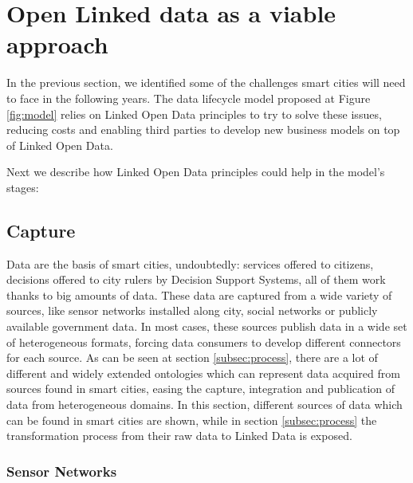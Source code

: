 \section{Open Linked data as a viable approach}

In the previous section, we identified some of the challenges smart cities will need to face in the following years. The data lifecycle model proposed at Figure \ref{fig:model} relies on Linked Open Data principles to try to solve these issues, reducing costs and enabling third parties to develop new business models on top of Linked Open Data.

Next we describe how Linked Open Data principles could help in the model's stages:

\subsection{Capture}
\label{sec:capture}

Data are the basis of smart cities, undoubtedly: services offered to citizens, decisions offered to city rulers by Decision Support Systems, all of them work thanks to big amounts of data. These data are captured from a wide variety of sources, like sensor networks installed along city, social networks or publicly available government data. In most cases, these sources publish data in a wide set of heterogeneous formats, forcing data consumers to develop different connectors for each source. As can be seen at section \ref{subsec:process}, there are a lot of different and widely extended ontologies which can represent data acquired from sources found in smart cities, easing the capture, integration and publication of data from heterogeneous domains. In this section, different sources of data which can be found in smart cities are shown, while in section \ref{subsec:process} the transformation process from their raw data to Linked Data is exposed. 

\subsubsection{Sensor Networks}\label{sensor_networks}

